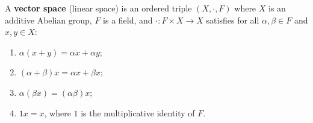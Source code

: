 A \textbf{vector space} (linear space) is an ordered triple \((X, \cdot, F)\) where \(X\) is an additive Abelian group, \(F\) is a field, and \(\cdot : F \times X \to X\) satisfies for all \(\alpha, \beta \in F\) and \(x, y \in X\):
\begin{enumerate}
\item[(i)] \(\alpha(x + y) = \alpha x + \alpha y\);
\item[(ii)] \((\alpha + \beta)x = \alpha x + \beta x\);
\item[(iii)] \(\alpha(\beta x) = (\alpha \beta)x\);
\item[(iv)] \(1x = x\), where \(1\) is the multiplicative identity of \(F\).
\end{enumerate}